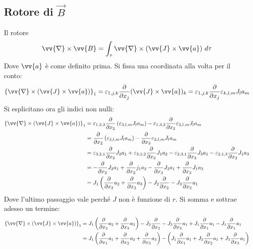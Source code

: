 \documentclass[a4paper, oneside]{article}
\begin{document}
\subsection{Rotore di $\vec{B}$ }
Il rotore 
\begin{gather*}
    \vv{\nabla}\times \vv{B} = \int_{\tau} \vv{\nabla} \times (\vv{J} \times \vv{a}  ) \ d\tau    
\end{gather*}
Dove $\vv{a}$ è come definito prima. Si fissa una coordinata alla volta per il conto:
\begin{gather*}
    \left\{ \vv{\nabla} \times \left(\vv{J} \times \vv{a}  \right) \right\}_1 = \varepsilon_{1, j, k} \frac{\partial }{\partial x_j} (\vv{J} \times \vv{a}  )_k = \varepsilon_{1, j, k} \frac{\partial }{\partial x_j} \varepsilon_{k, l, m} J_l a_m  
\end{gather*}
Si esplicitano ora gli indici non nulli: 
\begin{align*}
    \left\{ \vv{\nabla} \times \left(\vv{J} \times \vv{a}  \right) \right\}_1 &= \varepsilon_{1, 2, 3} \frac{\partial }{\partial x_2} \left(\varepsilon_{3, l , m} J_l a_m\right)  - \varepsilon_{1, 3, 2} \frac{\partial }{\partial x_3} \varepsilon_{2 ,l , m} J_l a_m    \\
    &= \frac{\partial }{\partial x_2} \left(\varepsilon_{3, l , m} J_l a_m\right)  - \frac{\partial }{\partial x_3} \varepsilon_{2 ,l , m} J_l a_m     \\
    &= \varepsilon_{3, 2, 1} \frac{\partial }{\partial x_2} J_2 a_1 + \varepsilon_{3, 1, 2} \frac{\partial }{\partial x_2} J_1 a_2 - \varepsilon_{2, 3, 1} \frac{\partial }{\partial x_3} J_3 a_1 - \varepsilon_{2, 1, 3} \frac{\partial }{\partial x_3} J_1 a_3  \\
    &= -\frac{\partial }{\partial x_2} J_2 a_1 + \frac{\partial }{\partial x_2} j_1 a_2 - \frac{\partial }{\partial x_3} J_3 a_1 + \frac{\partial }{\partial x_3} J_1 a_3 \\
    &= J_1\left(\frac{\partial }{\partial x_2} a_2 + \frac{\partial }{\partial x_3} a_3  \right) - J_2 \frac{\partial }{\partial x_2} - J_3 \frac{\partial }{\partial x_3} a_1
\end{align*}
Dove l'ultimo passaggio vale perché $J$ non è funzione di $r$. Si somma e sottrae adesso un termine: 
\begin{align*}
    \left\{ \vv{\nabla} \times \left(\vv{J} \times \vv{a}  \right) \right\}_1     &= J_1\left(\frac{\partial }{\partial x_2} a_2 + \frac{\partial }{\partial x_3} a_3  \right) - J_2 \frac{\partial }{\partial x_2} - J_3 \frac{\partial }{\partial x_3} a_1 + J_1 \frac{\partial }{\partial x_1} a_1 -  J_1 \frac{\partial }{\partial x_1}a_1 \\
    &=   J_1 \left(\frac{\partial }{\partial x_1} a_1 + \frac{\partial }{\partial x_2} a_2 + \frac{\partial }{\partial x_3} a_3   \right) - \left(J_1 \frac{\partial }{\partial x_1} a_1 + J_2 \frac{\partial }{\partial x_2}a_1 + J_3 \frac{\partial }{\partial x_3} a_1   \right)
\end{align*}
\end{document}
